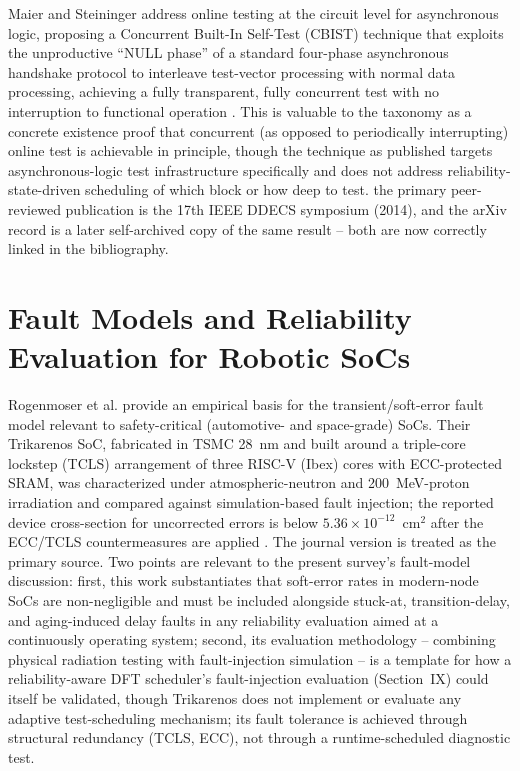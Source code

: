 \documentclass[journal]{IEEEtran}
\begin{document}
Maier and Steininger address online testing at the circuit level for asynchronous logic, proposing a Concurrent Built-In Self-Test (CBIST) technique that exploits the unproductive ``NULL phase'' of a standard four-phase asynchronous handshake protocol to interleave test-vector processing with normal data processing, achieving a fully transparent, fully concurrent test with no interruption to functional operation \cite{r16}. This is valuable to the taxonomy as a concrete existence proof that concurrent (as opposed to periodically interrupting) online test is achievable in principle, though the technique as published targets asynchronous-logic test infrastructure specifically and does not address reliability-state-driven scheduling of which block or how deep to test. the primary peer-reviewed publication is the 17th IEEE DDECS symposium (2014), and the arXiv record is a later self-archived copy of the same result -- both are now correctly linked in the bibliography.

\section{Fault Models and Reliability Evaluation for Robotic SoCs}
Rogenmoser et al. provide an empirical basis for the transient/soft-error fault model relevant to safety-critical (automotive- and space-grade) SoCs. Their Trikarenos SoC, fabricated in TSMC 28~nm and built around a triple-core lockstep (TCLS) arrangement of three RISC-V (Ibex) cores with ECC-protected SRAM, was characterized under atmospheric-neutron and 200~MeV-proton irradiation and compared against simulation-based fault injection; the reported device cross-section for uncorrected errors is below $5.36\times10^{-12}$~cm$^2$ after the ECC/TCLS countermeasures are applied \cite{r8,r17}. The journal version is treated as the primary source. Two points are relevant to the present survey's fault-model discussion: first, this work substantiates that soft-error rates in modern-node SoCs are non-negligible and must be included alongside stuck-at, transition-delay, and aging-induced delay faults in any reliability evaluation aimed at a continuously operating system; second, its evaluation methodology -- combining physical radiation testing with fault-injection simulation -- is a template for how a reliability-aware DFT scheduler's fault-injection evaluation (Section~IX) could itself be validated, though Trikarenos does not implement or evaluate any adaptive test-scheduling mechanism; its fault tolerance is achieved through structural redundancy (TCLS, ECC), not through a runtime-scheduled diagnostic test.
\end{document}
